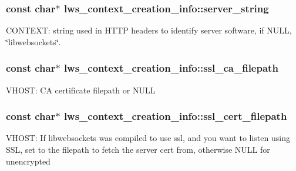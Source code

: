 \subsubsection[{\texorpdfstring{server\+\_\+string}{server\_string}}]{\setlength{\rightskip}{0pt plus 5cm}const char$\ast$ lws\+\_\+context\+\_\+creation\+\_\+info\+::server\+\_\+string}\hypertarget{structlws__context__creation__info_a137a9b9de4f6a7993fed8746d551e616}{}\label{structlws__context__creation__info_a137a9b9de4f6a7993fed8746d551e616}
C\+O\+N\+T\+E\+XT\+: string used in H\+T\+TP headers to identify server software, if N\+U\+LL, \char`\"{}libwebsockets\char`\"{}. 
\subsubsection[{\texorpdfstring{ssl\+\_\+ca\+\_\+filepath}{ssl\_ca\_filepath}}]{\setlength{\rightskip}{0pt plus 5cm}const char$\ast$ lws\+\_\+context\+\_\+creation\+\_\+info\+::ssl\+\_\+ca\+\_\+filepath}\hypertarget{structlws__context__creation__info_a4f8e65c3a059d3b586fafa9ef3282c29}{}\label{structlws__context__creation__info_a4f8e65c3a059d3b586fafa9ef3282c29}
V\+H\+O\+ST\+: CA certificate filepath or N\+U\+LL 
\subsubsection[{\texorpdfstring{ssl\+\_\+cert\+\_\+filepath}{ssl\_cert\_filepath}}]{\setlength{\rightskip}{0pt plus 5cm}const char$\ast$ lws\+\_\+context\+\_\+creation\+\_\+info\+::ssl\+\_\+cert\+\_\+filepath}\hypertarget{structlws__context__creation__info_ac62b0f0e8e402412ba5011d15c244103}{}\label{structlws__context__creation__info_ac62b0f0e8e402412ba5011d15c244103}
V\+H\+O\+ST\+: If libwebsockets was compiled to use ssl, and you want to listen using S\+SL, set to the filepath to fetch the server cert from, otherwise N\+U\+LL for unencrypted 
